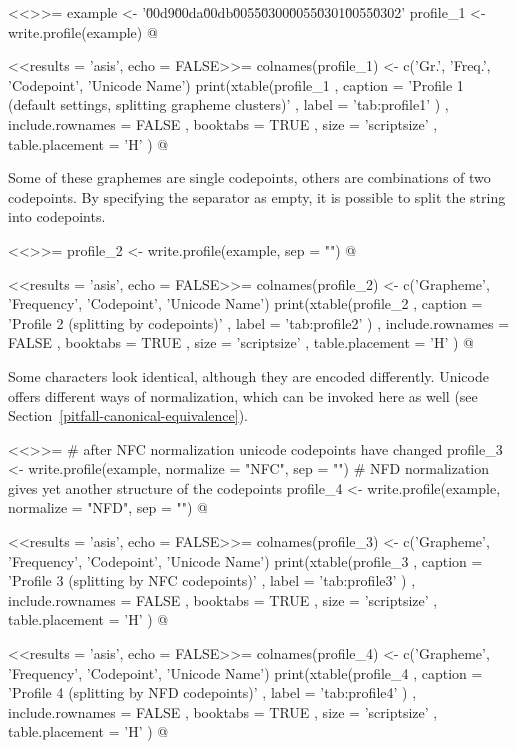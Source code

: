<<>>=
example <- '\u00d9\u00da\u00db\u0055\u0300\u0055\u0301\u0055\u0302'
profile_1 <- write.profile(example)
@

<<results = 'asis', echo = FALSE>>=
colnames(profile_1) <- c('Gr.', 'Freq.', 'Codepoint', 'Unicode Name')
print(xtable(profile_1
        , caption = 'Profile 1 (default settings, splitting grapheme clusters)'
        , label = 'tab:profile1'
        )
  , include.rownames = FALSE
  , booktabs = TRUE
  , size = 'scriptsize'
  , table.placement = 'H'
  )
@

\noindent Some of these graphemes are single codepoints, others are combinations
of two codepoints. By specifying the separator as empty, it is possible to split
the string into codepoints.

<<>>=
profile_2 <- write.profile(example, sep = "")
@

<<results = 'asis', echo = FALSE>>=
colnames(profile_2) <- c('Grapheme', 'Frequency', 'Codepoint', 'Unicode Name')
print(xtable(profile_2
        , caption = 'Profile 2 (splitting by codepoints)'
        , label = 'tab:profile2'
        )
  , include.rownames = FALSE
  , booktabs = TRUE
  , size = 'scriptsize'
  , table.placement = 'H'
  )
@

\noindent Some characters look identical, although they are encoded differently. 
Unicode offers different ways of normalization, which can be invoked here as 
well (see Section~\ref{pitfall-canonical-equivalence}).

<<>>=
# after NFC normalization unicode codepoints have changed
profile_3 <- write.profile(example, normalize = "NFC", sep = "")
# NFD normalization gives yet another structure of the codepoints
profile_4 <- write.profile(example, normalize = "NFD", sep = "")
@

<<results = 'asis', echo = FALSE>>=
colnames(profile_3) <- c('Grapheme', 'Frequency', 'Codepoint', 'Unicode Name')
print(xtable(profile_3
        , caption = 'Profile 3 (splitting by NFC codepoints)'
        , label = 'tab:profile3'
        )
  , include.rownames = FALSE
  , booktabs = TRUE
  , size = 'scriptsize'
  , table.placement = 'H'
  )
@

<<results = 'asis', echo = FALSE>>=
colnames(profile_4) <- c('Grapheme', 'Frequency', 'Codepoint', 'Unicode Name')
print(xtable(profile_4
        , caption = 'Profile 4 (splitting by NFD codepoints)'
        , label = 'tab:profile4'
        )
  , include.rownames = FALSE
  , booktabs = TRUE
  , size = 'scriptsize'
  , table.placement = 'H'
  )
@

